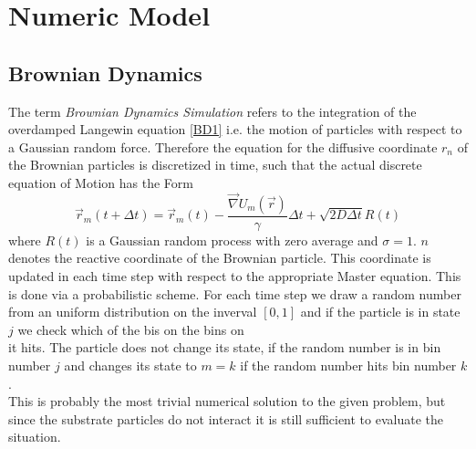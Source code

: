\section{Numeric Model}

\subsection{Brownian Dynamics}
The term \textit{Brownian Dynamics Simulation} refers to the integration of the overdamped Langewin equation \eqref{BD1} i.e. the motion of particles with respect to a Gaussian random force. Therefore the equation for the diffusive coordinate $r_n$ of the Brownian particles is discretized in time, such that the actual discrete equation of Motion has the Form
\begin{equation}
    \vec r_m(t + \Delta t) = \vec r_m(t) - \frac{\vec \nabla U_m(\vec r)}{\gamma}\Delta t + \sqrt{2 D \Delta t} R(t)
    \label{discrete_eqm}
\end{equation}
where $R(t)$ is a Gaussian random process with zero average and $\sigma = 1$. $n$ denotes the reactive coordinate of the Brownian particle. This coordinate is updated in each time step with respect to the appropriate Master equation. This is done via a probabilistic scheme. For each time step we draw a random number from an uniform distribution on the inverval $[0,1]$ and if the particle is in state $j$ we check which of the bis on the bins on 
\begin{equation}
    [W_{1,j}, \cdots , W_{j-1,j},1 - \sum_{i \ne j} W_{i,j}, W_{j+1,j}, \cdots , W_{M,j}]
    \label{num_meq}
\end{equation}
it hits. The particle does not change its state, if the random number is in bin number $j$ and changes its state to $m = k$ if the random number hits bin number $k$.\\
This is probably the most trivial numerical solution to the given problem, but since the substrate particles do not interact it is still sufficient to evaluate the situation.

